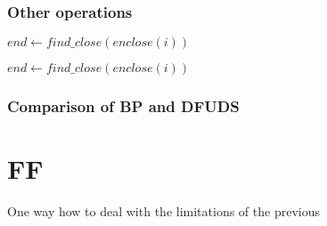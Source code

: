 \subsubsection{Other operations}

\begin{algorithmic}
		\State {}
	\Else
		\State $end \gets find\_close(enclose(i))$ 
		\State {}
	\EndIf
\EndFunction
\end{algorithmic}

\begin{algorithmic}
		\State {}
	\Else
		\State $end \gets find\_close(enclose(i))$ 
		\State {}
	\EndIf
\EndFunction
\end{algorithmic}

\subsubsection{Comparison of BP and DFUDS}


\section{FF}

One way how to deal with the limitations of the previous 
